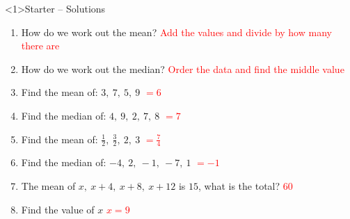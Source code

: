 \documentclass{beamer}
\begin{document}
\begin{frame}<1>{Starter -- Solutions}
\vspace{-0.8em}

\footnotesize
\begin{enumerate}\itemsep2pt
  \item How do we work out the mean?  
        \textcolor{red}{Add the values and divide by how many there are}
  \item How do we work out the median?  
        \textcolor{red}{Order the data and find the middle value}
  \item Find the mean of: $3,\ 7,\ 5,\ 9$  
        \textcolor{red}{$=6$}
  \item Find the median of: $4,\ 9,\ 2,\ 7,\ 8$  
        \textcolor{red}{$=7$}
  \item Find the mean of: $\frac{1}{2},\ \frac{3}{2},\ 2,\ 3$  
        \textcolor{red}{$=\frac{7}{4}$}
  \item Find the median of: $-4,\ 2,\ -1,\ -7,\ 1$  
        \textcolor{red}{$=-1$}
  \item The mean of $x,\ x+4,\ x+8,\ x+12$ is $15$, what is the total?  
        \textcolor{red}{$60$}
  \item Find the value of $x$  
        \textcolor{red}{$x=9$}
\end{enumerate}
\end{frame}
\end{document}
